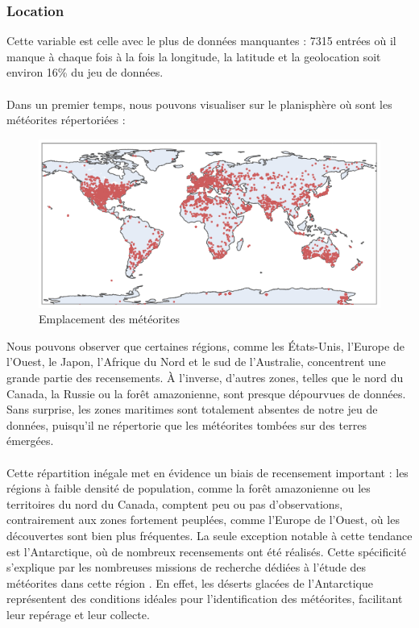 \documentclass[12pt]{article}
\begin{document}
\subsubsection*{Location}
Cette variable est celle avec le plus de données manquantes : 7315 entrées où il manque à chaque fois à la fois la longitude, la latitude et la geolocation soit environ 16\% du jeu de données.\\
\\
Dans un premier temps, nous pouvons visualiser sur le planisphère où sont les météorites répertoriées :\\
\begin{figure}[H]
\centering
\includegraphics[width=14cm]{Images/exploration/points_monde.png}
\caption{Emplacement des météorites}
\end{figure}
Nous pouvons observer que certaines régions, comme les États-Unis, l’Europe de l’Ouest, le Japon, l’Afrique du Nord et le sud de l’Australie, concentrent une grande partie des recensements. À l’inverse, d’autres zones, telles que le nord du Canada, la Russie ou la forêt amazonienne, sont presque dépourvues de données. Sans surprise, les zones maritimes sont totalement absentes de notre jeu de données, puisqu’il ne répertorie que les météorites tombées sur des terres émergées.\\
\\
Cette répartition inégale met en évidence un biais de recensement important : les régions à faible densité de population, comme la forêt amazonienne ou les territoires du nord du Canada, comptent peu ou pas d’observations, contrairement aux zones fortement peuplées, comme l’Europe de l’Ouest, où les découvertes sont bien plus fréquentes. La seule exception notable à cette tendance est l’Antarctique, où de nombreux recensements ont été réalisés. Cette spécificité s’explique par les nombreuses missions de recherche dédiées à l’étude des météorites dans cette région \cite{Mission_recherche_antartictique}. En effet, les déserts glacées de l’Antarctique représentent des conditions idéales pour l’identification des météorites, facilitant leur repérage et leur collecte.\\
\end{document}
